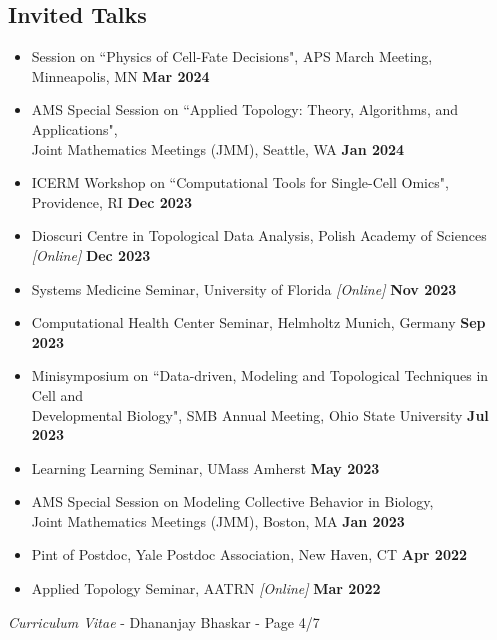 \documentclass[margin,line]{res}
\begin{document}
\begin{resume}
\section{\sc Invited Talks}
{\renewcommand\leftmargini{0em}
\begin{itemize}
\setlength\itemsep{0.3em}
\item[] Session on ``Physics of Cell-Fate Decisions", APS March Meeting, Minneapolis, MN \hfill {\bf \small Mar 2024} 
\item[] AMS Special Session on ``Applied Topology: Theory, Algorithms, and Applications",\\Joint Mathematics Meetings (JMM), Seattle, WA \hfill {\bf \small Jan 2024} 
\item[] ICERM Workshop on ``Computational Tools for Single-Cell Omics", Providence, RI \hfill {\bf \small Dec 2023} 
\item[] Dioscuri Centre in Topological Data Analysis, Polish Academy of Sciences \textit{[Online]} \hfill {\bf \small Dec 2023}
\item[] Systems Medicine Seminar, University of Florida \textit{[Online]} \hfill {\bf \small Nov 2023}
\item[] Computational Health Center Seminar, Helmholtz Munich, Germany \hfill {\bf \small Sep 2023}
\item[] Minisymposium on ``Data-driven, Modeling and Topological Techniques in Cell and \\Developmental Biology", SMB Annual Meeting, Ohio State University \hfill {\bf \small Jul 2023}
\item[] Learning Learning Seminar, UMass Amherst \hfill {\bf \small May 2023}
\item[] AMS Special Session on Modeling Collective Behavior in Biology,\\Joint Mathematics Meetings (JMM), Boston, MA \hfill {\bf \small Jan 2023}
\item[] Pint of Postdoc, Yale Postdoc Association, New Haven, CT \hfill {\bf \small Apr 2022}
\item[] Applied Topology Seminar, AATRN \textit{[Online]} \hfill {\bf \small Mar 2022}
\end{itemize}
}

\newpage
\begin{flushright}
\textit{Curriculum Vitae} - Dhananjay Bhaskar - Page 4/7
\end{flushright}
\vspace*{.02cm}


\end{resume}
\end{document}
